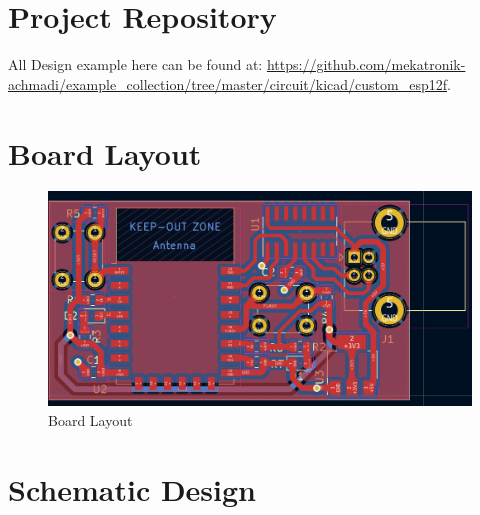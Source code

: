 \documentclass[a4paper,12pt,oneside,pdflatex,italian,final,twocolumn]{article}
\begin{document}
	\raggedright
	
	\section{Project Repository}
	
	All Design example here can be found at: \url{https://github.com/mekatronik-achmadi/example_collection/tree/master/circuit/kicad/custom_esp12f}.
	
	\section{Board Layout}
	
	\begin{figure}[h]
		\centering
		\includegraphics[width=\textwidth]{images/board.png}
		\caption{Board Layout}
	\end{figure}

	\section{Schematic Design}
	
	\newpage
	
	
	\raggedright
	
	\newpage
\end{document}
